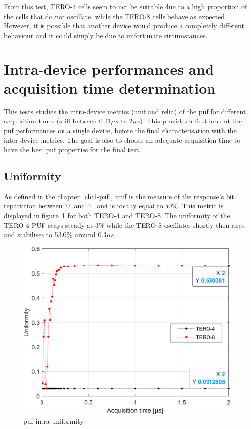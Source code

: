 From this test, TERO-4 cells seem to not be suitable due to a high proportion of the cells that do not oscillate, while the TERO-8 cells behave as expected. However, it is possible that another device would produce a completely different behaviour and it could simply be due to unfortunate circumstances.\\


\section{Intra-device performances and acquisition time determination}

This tests studies the intra-device metrics (\acrlong{unif} and \acrlong{relia})  of the \acrshort{puf} for different acquisition times (still between $0.01\mu s$ to $2\mu s$). This provides a first look at the \acrshort{puf} performances on a single device, before the final characterisation with the inter-device metrics. The goal is also to choose an adequate acquisition time to have the best \acrshort{puf} properties for the final test.\\

\subsection{Uniformity}

As defined in the chapter~\ref{ch:1-puf}, \acrfull{unif} is the measure of the response's bit repartition between '0' and '1' and is ideally equal to 50\%. This metric is displayed in figure~\ref{fig:all_intra_uniformity} for both TERO-4 and TERO-8. The uniformity of the TERO-4 PUF stays steady at 3\% while the TERO-8 oscillates shortly then rises and stabilises to 53.0\% around $0.3\mu s$.\\


\begin{figure}[H]
    \centering
    \includegraphics[width=0.8\linewidth]{images/all_intra_uniformity.png}
    \caption{\acrshort{puf} intra-uniformity}
    \label{fig:all_intra_uniformity}
\end{figure}

